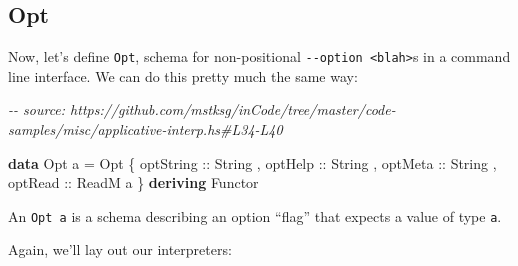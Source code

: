 \documentclass[]{article}
\newenvironment{Shaded}{}{}
\newcommand{\CommentTok}[1]{\textcolor[rgb]{0.38,0.63,0.69}{\textit{#1}}}
\newcommand{\DataTypeTok}[1]{\textcolor[rgb]{0.56,0.13,0.00}{#1}}
\newcommand{\KeywordTok}[1]{\textcolor[rgb]{0.00,0.44,0.13}{\textbf{#1}}}
\newcommand{\NormalTok}[1]{#1}
\newcommand{\OperatorTok}[1]{\textcolor[rgb]{0.40,0.40,0.40}{#1}}
\newcommand{\OtherTok}[1]{\textcolor[rgb]{0.00,0.44,0.13}{#1}}
\newcommand{\StringTok}[1]{\textcolor[rgb]{0.25,0.44,0.63}{#1}}
\begin{document}
\hypertarget{opt}{%
\subsection{Opt}\label{opt}}

Now, let's define \texttt{Opt}, schema for non-positional
\texttt{-\/-option\ \textless{}blah\textgreater{}}s in a command line interface.
We can do this pretty much the same way:

\begin{Shaded}
\begin{Highlighting}[]
\CommentTok{{-}{-} source: https://github.com/mstksg/inCode/tree/master/code{-}samples/misc/applicative{-}interp.hs\#L34{-}L40}

\KeywordTok{data} \DataTypeTok{Opt}\NormalTok{ a }\OtherTok{=} \DataTypeTok{Opt}
\NormalTok{    \{}\OtherTok{ optString ::} \DataTypeTok{String}
\NormalTok{    ,}\OtherTok{ optHelp   ::} \DataTypeTok{String}
\NormalTok{    ,}\OtherTok{ optMeta   ::} \DataTypeTok{String}
\NormalTok{    ,}\OtherTok{ optRead   ::} \DataTypeTok{ReadM}\NormalTok{ a}
\NormalTok{    \}}
  \KeywordTok{deriving} \DataTypeTok{Functor}
\end{Highlighting}
\end{Shaded}

An \texttt{Opt\ a} is a schema describing an option ``flag'' that expects a
value of type \texttt{a}.

Again, we'll lay out our interpreters:

\begin{Shaded}
\end{Shaded}
\end{document}
